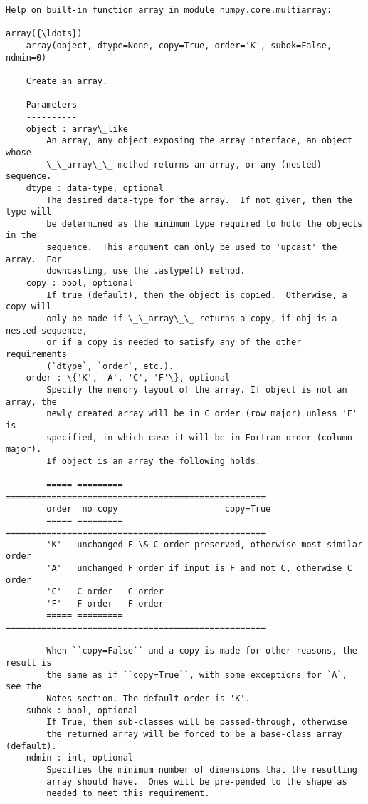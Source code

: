 \documentclass[11pt]{article}
\begin{document}
    \begin{Verbatim}[commandchars=\\\{\}]
Help on built-in function array in module numpy.core.multiarray:

array({\ldots})
    array(object, dtype=None, copy=True, order='K', subok=False, ndmin=0)
    
    Create an array.
    
    Parameters
    ----------
    object : array\_like
        An array, any object exposing the array interface, an object whose
        \_\_array\_\_ method returns an array, or any (nested) sequence.
    dtype : data-type, optional
        The desired data-type for the array.  If not given, then the type will
        be determined as the minimum type required to hold the objects in the
        sequence.  This argument can only be used to 'upcast' the array.  For
        downcasting, use the .astype(t) method.
    copy : bool, optional
        If true (default), then the object is copied.  Otherwise, a copy will
        only be made if \_\_array\_\_ returns a copy, if obj is a nested sequence,
        or if a copy is needed to satisfy any of the other requirements
        (`dtype`, `order`, etc.).
    order : \{'K', 'A', 'C', 'F'\}, optional
        Specify the memory layout of the array. If object is not an array, the
        newly created array will be in C order (row major) unless 'F' is
        specified, in which case it will be in Fortran order (column major).
        If object is an array the following holds.
    
        ===== ========= ===================================================
        order  no copy                     copy=True
        ===== ========= ===================================================
        'K'   unchanged F \& C order preserved, otherwise most similar order
        'A'   unchanged F order if input is F and not C, otherwise C order
        'C'   C order   C order
        'F'   F order   F order
        ===== ========= ===================================================
    
        When ``copy=False`` and a copy is made for other reasons, the result is
        the same as if ``copy=True``, with some exceptions for `A`, see the
        Notes section. The default order is 'K'.
    subok : bool, optional
        If True, then sub-classes will be passed-through, otherwise
        the returned array will be forced to be a base-class array (default).
    ndmin : int, optional
        Specifies the minimum number of dimensions that the resulting
        array should have.  Ones will be pre-pended to the shape as
        needed to meet this requirement.
    

\end{Verbatim}
\end{document}

